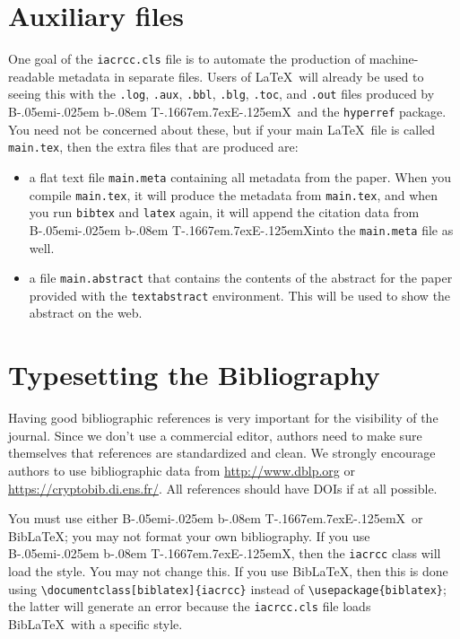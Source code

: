 \documentclass{iacrcc}
\def\BibTeX{{\rm B\kern-.05em{\sc i\kern-.025em b}\kern-.08em
    T\kern-.1667em\lower.7ex\hbox{E}\kern-.125emX}}
\def\BibLaTeX{Bib\LaTeX}
\begin{document}
\section{Auxiliary files}
One goal of the \texttt{iacrcc.cls}
  file is to automate the production of machine-readable metadata in
  separate files. Users of \LaTeX\ will already be used to seeing this
  with the \texttt{.log}, \texttt{.aux}, \texttt{.bbl}, \texttt{.blg},
  \texttt{.toc}, and \texttt{.out} files produced by \BibTeX\ 
  and the \texttt{hyperref} package.  You need not be concerned about
  these, but if your main \LaTeX\ file is called \texttt{main.tex},
  then the extra files that are produced are:
\begin{itemize}
\item a flat text file \texttt{main.meta} containing all metadata
  from the paper.  When you compile
  \texttt{main.tex}, it will produce the metadata from
  \texttt{main.tex}, and when you run \texttt{bibtex} and
  \texttt{latex} again, it will append the citation data from
  \BibTeX into the \texttt{main.meta} file as well.
\item a file \texttt{main.abstract} that contains
  the contents of the abstract for the paper provided with the
  \texttt{textabstract} environment. This will be used to show
  the abstract on the web.
\end{itemize}

\section{Typesetting the Bibliography}
\label{sec:biblio}

Having good bibliographic references is very important for the
visibility of the journal.  Since we don't use a commercial editor,
authors need to make sure themselves that references are standardized
and clean.  We strongly encourage authors to use bibliographic data
from \url{http://www.dblp.org} or \url{https://cryptobib.di.ens.fr/}.
All references should have DOIs if at all possible.

You must use either \BibTeX\ or \BibLaTeX; you may not format your own bibliography.
If you use \BibTeX, then the \texttt{iacrcc} class will load the
\verb++ style.  You may not change
this. If you use \BibLaTeX, then this is done using
\verb+\documentclass[biblatex]{iacrcc}+ instead of
\verb+\usepackage{biblatex}+; the latter will generate an error
because the \texttt{iacrcc.cls} file loads \BibLaTeX\ with a
specific style.
\end{document}
